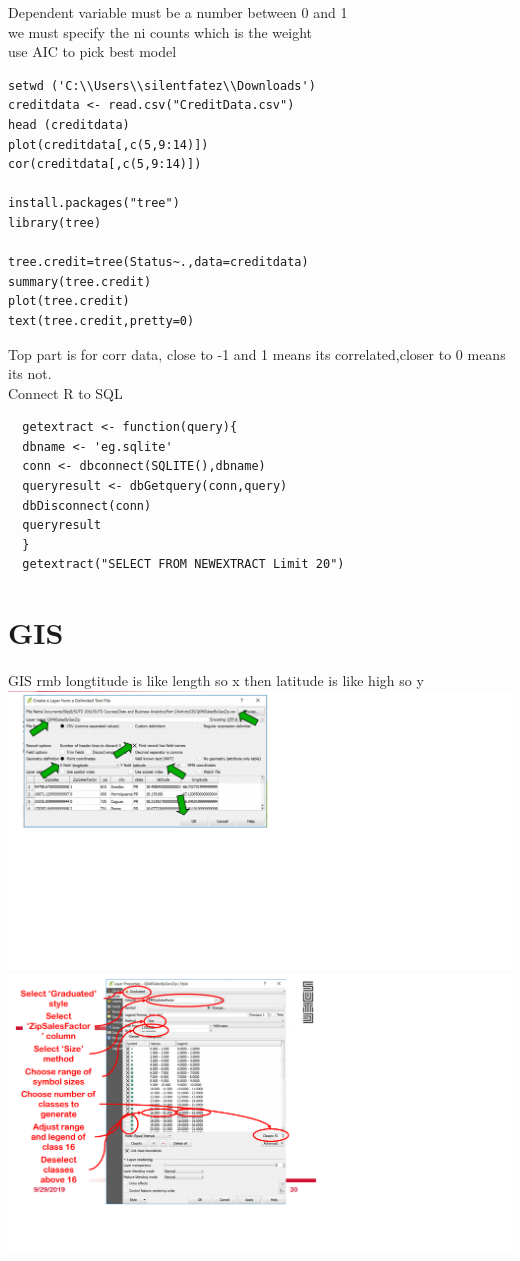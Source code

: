 \documentclass{article}
\begin{document}
Dependent variable must be a number between 0 and 1\\
we must specify the ni counts which is the weight\\
use AIC to pick best model\\
\begin{verbatim}
setwd ('C:\\Users\\silentfatez\\Downloads')
creditdata <- read.csv("CreditData.csv")
head (creditdata)
plot(creditdata[,c(5,9:14)])
cor(creditdata[,c(5,9:14)])

install.packages("tree")
library(tree)

tree.credit=tree(Status~.,data=creditdata)
summary(tree.credit)
plot(tree.credit)
text(tree.credit,pretty=0)

\end{verbatim}
Top part is for corr data, close to -1 and 1 means its correlated,closer to 0 means its not.\\
Connect R to SQL\\
\begin{verbatim}
  getextract <- function(query){
  dbname <- 'eg.sqlite'
  conn <- dbconnect(SQLITE(),dbname)
  queryresult <- dbGetquery(conn,query)
  dbDisconnect(conn)
  queryresult
  }
  getextract("SELECT FROM NEWEXTRACT Limit 20")
\end{verbatim}
\section{GIS}
GIS rmb longtitude is like length so x then latitude is like high so y\\
\includegraphics{gis}
\includegraphics{gis2}
\end{document}
